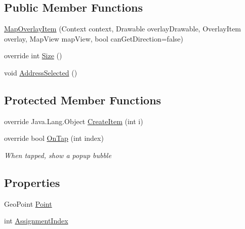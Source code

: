 \subsection*{Public Member Functions}
\begin{DoxyCompactItemize}
\item 
\hyperlink{class_field_service_1_1_android_1_1_utilities_1_1_map_overlay_item_a8af84df4362e8d2239a4687ce98d9dda}{Map\+Overlay\+Item} (Context context, Drawable overlay\+Drawable, Overlay\+Item overlay, Map\+View map\+View, bool can\+Get\+Direction=false)
\item 
override int \hyperlink{class_field_service_1_1_android_1_1_utilities_1_1_map_overlay_item_ac7119a971e7237e307989e59247bf664}{Size} ()
\item 
void \hyperlink{class_field_service_1_1_android_1_1_utilities_1_1_map_overlay_item_a0e8139bf13dbb0cafd07ab68cdd7f583}{Address\+Selected} ()
\end{DoxyCompactItemize}
\subsection*{Protected Member Functions}
\begin{DoxyCompactItemize}
\item 
override Java.\+Lang.\+Object \hyperlink{class_field_service_1_1_android_1_1_utilities_1_1_map_overlay_item_a8f9ffc2e176118c20c43a95d117d0d13}{Create\+Item} (int i)
\item 
override bool \hyperlink{class_field_service_1_1_android_1_1_utilities_1_1_map_overlay_item_ac23b15aaf081ad2ce94467feba7108f8}{On\+Tap} (int index)
\begin{DoxyCompactList}\small\item\em When tapped, show a popup bubble \end{DoxyCompactList}\end{DoxyCompactItemize}
\subsection*{Properties}
\begin{DoxyCompactItemize}
\item 
Geo\+Point \hyperlink{class_field_service_1_1_android_1_1_utilities_1_1_map_overlay_item_aac170dd1442e6067e0524800b9af4538}{Point}
\item 
int \hyperlink{class_field_service_1_1_android_1_1_utilities_1_1_map_overlay_item_acbc19986d7e7b8271b32788477ace439}{Assignment\+Index}
\end{DoxyCompactItemize}


